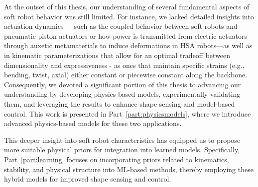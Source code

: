 At the outset of this thesis, our understanding of several fundamental aspects of soft robot behavior was still limited. For instance, we lacked detailed insights into actuation dynamics~\citep{della2023model}—such as the coupled behavior between soft robots and pneumatic piston actuators or how power is transmitted from electric actuators through auxetic metamaterials to induce deformations in \gls{HSA} robots—as well as in kinematic parameterizations that allow for an optimal tradeoff between dimensionality and expressiveness - as ones that maintain specific strains (e.g., bending, twist, axial) either constant or piecewise constant along the backbone. Consequently, we devoted a significant portion of this thesis to advancing our understanding by developing physics-based models, experimentally validating them, and leveraging the results to enhance shape sensing and model-based control. This work is presented in Part~\ref{part:physicsmodels}, where we introduce advanced physics-based models for these two applications.

This deeper insight into soft robot characteristics has equipped us to propose more suitable physical priors for integration into learned models. Specifically, Part~\ref{part:learning} focuses on incorporating priors related to kinematics, stability, and physical structure into \gls{ML}-based methods, thereby employing these hybrid models for improved shape sensing and control. 

